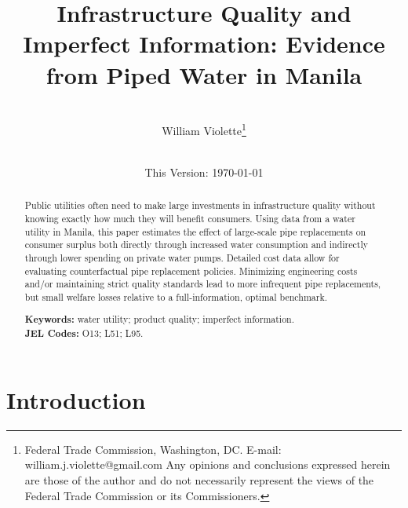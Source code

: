 \documentclass[12pt,table]{article}
\begin{document}
\begin{titlepage} 
\title{Infrastructure Quality and Imperfect Information: Evidence from Piped Water in Manila}
\author{\\[3em]
  William Violette\thanks{Federal Trade Commission, Washington, DC. E-mail: william.j.violette@gmail.com   Any opinions and conclusions expressed herein are those of the author and do not necessarily represent the views of the Federal Trade Commission or its Commissioners.  } \\ %
 \\ 
  }
\vspace{30mm}
\date{\vspace{5mm}This Version: \today}
\maketitle
\begin{abstract}

Public utilities often need to make large investments in infrastructure quality without knowing exactly how much they will benefit consumers.  Using data from a water utility in Manila, this paper estimates the effect of large-scale pipe replacements on consumer surplus both directly through increased water consumption and indirectly through lower spending on private water pumps.  Detailed cost data allow for evaluating counterfactual pipe replacement policies.  Minimizing engineering costs and/or maintaining strict quality standards lead to more infrequent pipe replacements, but small welfare losses relative to a full-information, optimal benchmark.  


\vspace{1in}
\textbf{Keywords:} water utility; product quality; imperfect information. \\
\textbf{JEL Codes:} O13; L51; L95. \\
\bigskip
\end{abstract}
\setcounter{page}{0}
\thispagestyle{empty}
\end{titlepage}
\pagebreak \newpage

\onehalfspacing

\section{Introduction}
\end{document}
